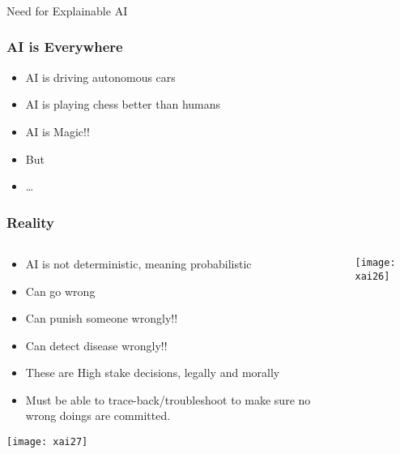 \begin{frame}[fragile]\frametitle{}
\begin{center}
{\Large Need for Explainable AI}
\end{center}
\end{frame}


\begin{frame}[fragile]\frametitle{AI is Everywhere}
\begin{itemize}
\item AI is driving autonomous cars
\item AI is playing chess better than humans
\item AI is Magic!!
\item But
\item \ldots
\end{itemize}
\end{frame}

\begin{frame}[fragile]\frametitle{Reality}

\begin{columns}
    \begin{column}[T]{0.6\linewidth}
		
			\begin{itemize}
			\item AI is not deterministic, meaning probabilistic
			\item Can go wrong
			\item Can punish someone wrongly!!
			\item Can detect disease wrongly!!
			\item These are High stake decisions, legally and morally
			\item Must be able to trace-back/troubleshoot to make sure no wrong doings are committed.
			\end{itemize}
				
      \begin{center}
      \texttt{[image: xai27]}
	  	\end{center}
			
    \end{column}
    \begin{column}[T]{0.4\linewidth}

      \begin{center}
      \texttt{[image: xai26]}
	  	\end{center}
    \end{column}
  \end{columns}
	
	

\end{frame}

